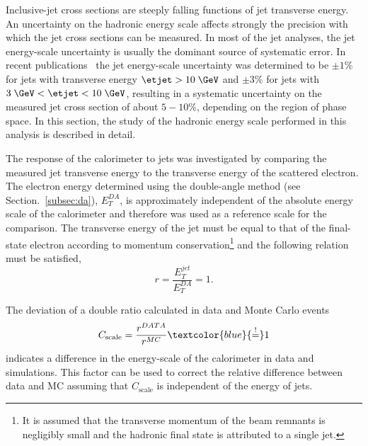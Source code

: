 Inclusive-jet cross sections are steeply falling functions of jet transverse energy. An uncertainty on the hadronic energy scale affects strongly the precision with which the jet cross sections can be measured. In most of the jet analyses, the jet energy-scale uncertainty is usually the dominant source of systematic error. In recent \zeus publications~\cite{epj:c70:965, np:b864:1} the jet energy-scale uncertainty was determined to be $\pm 1\%$ for jets with transverse energy $\etjet>10\; \GeV$ and $\pm 3\%$ for jets with $3\; \GeV<\etjet < 10\; \GeV$, resulting in a systematic uncertainty on the measured jet cross section of about $5-10\%$, depending on the region of phase space. In this section, the study of the hadronic energy scale performed in this analysis is described in detail.

The response of the calorimeter to jets was investigated by comparing the measured jet transverse energy to the transverse energy of the scattered electron. The electron energy determined using the double-angle method (see Section.~\ref{subsec:da}), $E_T^{DA}$, is approximately independent of the absolute energy scale of the calorimeter and therefore was used as a reference scale for the comparison. The transverse energy of the jet must be equal to that of the final-state electron according to momentum conservation\footnote{It is assumed that the transverse momentum of the beam remnants is negligibly small and the hadronic final state is attributed to a single jet.} and the following relation must be satisfied,
\begin{equation}
r = \frac{E_T^{jet}}{E_T^{DA}} = 1.
\label{eq:etjetetelbalance}
\end{equation}

The deviation of a double ratio calculated in data and Monte Carlo events
\begin{equation}
C_\text{scale} = \frac{r^{DATA}}{r^{MC}} \textcolor{blue}{\stackrel{!}{=}} 1
\label{eq:cscale}
\end{equation}
indicates a difference in the energy-scale of the calorimeter in data and simulations. This factor can be used to correct the relative difference between data and MC assuming that $C_\text{scale}$ is independent of the energy of jets. 

